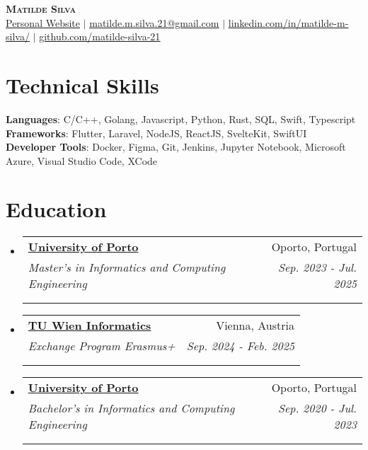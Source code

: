 \documentclass[letterpaper,11pt]{article}
\makeatletter
\newcommand{\resumeSubheading}[5]{
  \vspace{-2pt}\item
    \begin{tabular*}{0.97\textwidth}[t]{l@{\extracolsep{\fill}}r}
      \textbf{#1} & #2 \\
      \textit{\small#3} & \textit{\small #4} \\
      \if\relax\detokenize{#5}\relax
      \else
        \multicolumn{2}{@{}l}{\textit{\small#5}} \\
      \fi
    \end{tabular*}\vspace{-7pt}
}
\newcommand{\resumeSubHeadingListStart}{\begin{itemize}[leftmargin=0.15in, label={}]}
\newcommand{\resumeSubHeadingListEnd}{\end{itemize}}
\makeatother
\begin{document}

\begin{center}
    \textbf{\Huge \scshape Matilde Silva} \\ \vspace{10pt}
    \small \href{https://matilde-silva-21.github.io/}{\uline{Personal Website}} $|$ \href{mailto:x@x.com}{\uline{matilde.m.silva.21@gmail.com}} $|$ 
    \href{https://www.linkedin.com/in/matilde-m-silva/}{\uline{linkedin.com/in/matilde-m-silva/}} $|$
    \href{https://github.com/matilde-silva-21}{\uline{github.com/matilde-silva-21}}
\end{center}


\section{Technical Skills}
 \begin{itemize}[leftmargin=0.15in, label={}]
    \small{\item{
     \textbf{Languages}{: C/C++, Golang, Javascript, Python, Rust, SQL, Swift, Typescript} \\
     \textbf{Frameworks}{: Flutter, Laravel, NodeJS, ReactJS, SvelteKit, SwiftUI} \\
     \textbf{Developer Tools}{: Docker, Figma, Git, Jenkins, Jupyter Notebook, Microsoft Azure, Visual Studio Code, XCode}
    }}
 \end{itemize}

\section{Education}
  \resumeSubHeadingListStart
      \resumeSubheading
      {\href{https://sigarra.up.pt/feup/en/WEB_PAGE.INICIAL}{University of Porto}}{Oporto, Portugal}
      {Master’s in Informatics and Computing Engineering}{Sep. 2023 - Jul. 2025}
      {Current Grade: 16/20}
    \resumeSubheading
      {\href{https://informatics.tuwien.ac.at/}{TU Wien Informatics}}{Vienna, Austria}
      {Exchange Program Erasmus+}{Sep. 2024 - Feb. 2025}
      {}
    \resumeSubheading
      {\href{https://sigarra.up.pt/feup/en/WEB_PAGE.INICIAL}{University of Porto}}{Oporto, Portugal}
      {Bachelor’s in Informatics and Computing Engineering}{Sep. 2020 - Jul. 2023}
      {Final Grade: 15/20}
  \resumeSubHeadingListEnd
\leavevmode \\ %
\end{document}
